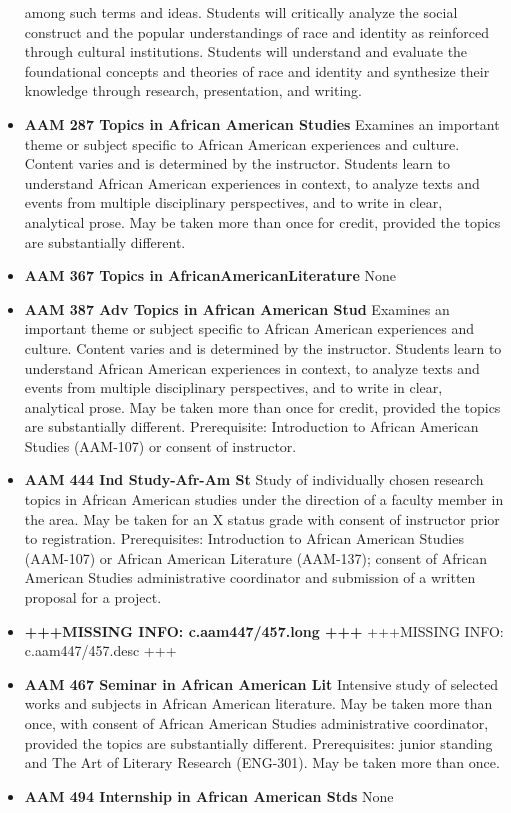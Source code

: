 \documentclass[
  letterpaper,
]{scrbook}
\begin{document}
\begin{itemize}
  among such terms and ideas. Students will critically analyze the
  social construct and the popular understandings of race and identity
  as reinforced through cultural institutions. Students will understand
  and evaluate the foundational concepts and theories of race and
  identity and synthesize their knowledge through research,
  presentation, and writing.
\item
  \textbf{AAM 287 Topics in African American Studies} Examines an
  important theme or subject specific to African American experiences
  and culture. Content varies and is determined by the instructor.
  Students learn to understand African American experiences in context,
  to analyze texts and events from multiple disciplinary perspectives,
  and to write in clear, analytical prose. May be taken more than once
  for credit, provided the topics are substantially different.
\item
  \textbf{AAM 367 Topics in AfricanAmericanLiterature} None
\item
  \textbf{AAM 387 Adv Topics in African American Stud} Examines an
  important theme or subject specific to African American experiences
  and culture. Content varies and is determined by the instructor.
  Students learn to understand African American experiences in context,
  to analyze texts and events from multiple disciplinary perspectives,
  and to write in clear, analytical prose. May be taken more than once
  for credit, provided the topics are substantially different.
  Prerequisite: Introduction to African American Studies (AAM-107) or
  consent of instructor.
\item
  \textbf{AAM 444 Ind Study-Afr-Am St} Study of individually chosen
  research topics in African American studies under the direction of a
  faculty member in the area. May be taken for an X status grade with
  consent of instructor prior to registration. Prerequisites:
  Introduction to African American Studies (AAM-107) or African American
  Literature (AAM-137); consent of African American Studies
  administrative coordinator and submission of a written proposal for a
  project.
\item
  \textbf{+++MISSING INFO: c.aam447/457.long +++} +++MISSING INFO:
  c.aam447/457.desc +++
\item
  \textbf{AAM 467 Seminar in African American Lit} Intensive study of
  selected works and subjects in African American literature. May be
  taken more than once, with consent of African American Studies
  administrative coordinator, provided the topics are substantially
  different. Prerequisites: junior standing and The Art of Literary
  Research (ENG-301). May be taken more than once.
\item
  \textbf{AAM 494 Internship in African American Stds} None
\end{itemize}
\end{document}
